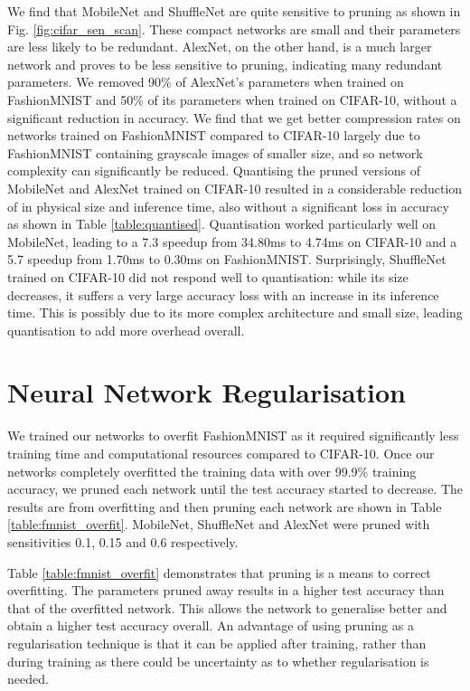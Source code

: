 \documentclass[conference]{IEEEtran}
\begin{document}
We find that MobileNet and ShuffleNet are quite sensitive to pruning as shown in Fig. \ref{fig:cifar_sen_scan}. These compact networks are small and their parameters are less likely to be redundant. AlexNet, on the other hand, is a much larger network and proves to be less sensitive to pruning, indicating many redundant parameters. We removed 90\% of AlexNet's parameters when trained on FashionMNIST and 50\% of its parameters when trained on CIFAR-10, without a significant reduction in accuracy. We find that we get better compression rates on networks trained on FashionMNIST compared to CIFAR-10 largely due to FashionMNIST containing grayscale images of smaller size, and so network complexity can significantly be reduced.
Quantising the pruned versions of MobileNet and AlexNet trained on CIFAR-10 resulted in a considerable reduction of in physical size and inference time, also without a significant loss in accuracy as shown in Table \ref{table:quantised}. Quantisation worked particularly well on MobileNet, leading to a 7.3 speedup from 34.80ms to 4.74ms on CIFAR-10 and a 5.7 speedup from 1.70ms to 0.30ms on FashionMNIST. Surprisingly, ShuffleNet trained on CIFAR-10 did not respond well to quantisation: while its size decreases, it suffers a very large accuracy loss with an increase in its inference time. This is possibly due to its more complex architecture and small size, leading quantisation to add more overhead overall.





\section{Neural Network Regularisation}
We trained our networks to overfit FashionMNIST as it required significantly less training time and computational resources compared to CIFAR-10. Once our networks completely overfitted the training data with over 99.9\% training accuracy, we pruned each network until the test accuracy started to decrease. The results are from overfitting and then pruning each network are shown in Table \ref{table:fmnist_overfit}. MobileNet, ShuffleNet and AlexNet were pruned with sensitivities 0.1, 0.15 and 0.6 respectively.

Table \ref{table:fmnist_overfit} demonstrates that pruning is a means to correct overfitting. The parameters pruned away results in a higher test accuracy than that of the overfitted network. This allows the network to generalise better and obtain a higher test accuracy overall. An advantage of using pruning as a regularisation technique is that it can be applied after training, rather than during training as there could be uncertainty as to whether regularisation is needed.
\end{document}
